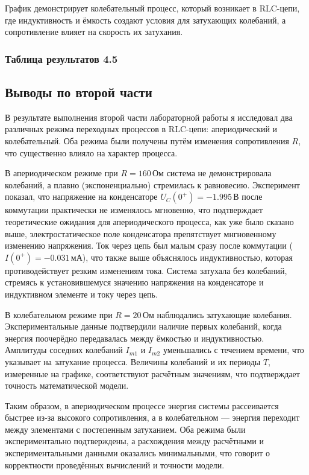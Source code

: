 График демонстрирует колебательный процесс, который возникает в RLC-цепи, где индуктивность и ёмкость создают условия для затухающих колебаний, а сопротивление влияет на скорость их затухания.


\subsubsection{Таблица результатов 4.5}


\subsection{Выводы по второй части}

В результате выполнения второй части лабораторной работы я исследовал два различных режима переходных процессов в RLC-цепи: апериодический и колебательный. Оба режима были получены путём изменения сопротивления \( R \), что существенно влияло на характер процесса.

В апериодическом режиме при \( R = 160 \, \text{Ом} \) система не демонстрировала колебаний, а плавно (экспоненциально) стремилась к равновесию. Эксперимент показал, что напряжение на конденсаторе \( U_C(0^+) = -1.995 \, \text{В} \) после коммутации практически не изменялось мгновенно, что подтверждает теоретические ожидания для апериодического процесса, как уже было сказано выше, электростатическое поле конденсатора препятствует мнгновенному изменению напряжения. Ток через цепь был малым сразу после коммутации (\( I(0^+) = -0.031 \, \text{мА} \)), что также выше объяснялось индуктивностью, которая противодействует резким изменениям тока. Система затухала без колебаний, стремясь к установившемуся значению напряжения на конденсаторе и индуктивном элементе и току через цепь.

В колебательном режиме при \( R = 20 \, \text{Ом} \) наблюдались затухающие колебания. Экспериментальные данные подтвердили наличие первых колебаний, когда энергия поочерёдно передавалась между ёмкостью и индуктивностью. Амплитуды соседних колебаний \( I_{m1} \) и \( I_{m2} \) уменьшались с течением времени, что указывает на затухание процесса. Величины колебаний и их периоды \( T \), измеренные на графике, соответствуют расчётным значениям, что подтверждает точность математической модели.

Таким образом, в апериодическом процессе энергия системы рассеивается быстрее из-за высокого сопротивления, а в колебательном — энергия переходит между элементами с постепенным затуханием. Оба режима были экспериментально подтверждены, а расхождения между расчётными и экспериментальными данными оказались минимальными, что говорит о корректности проведённых вычислений и точности модели.

